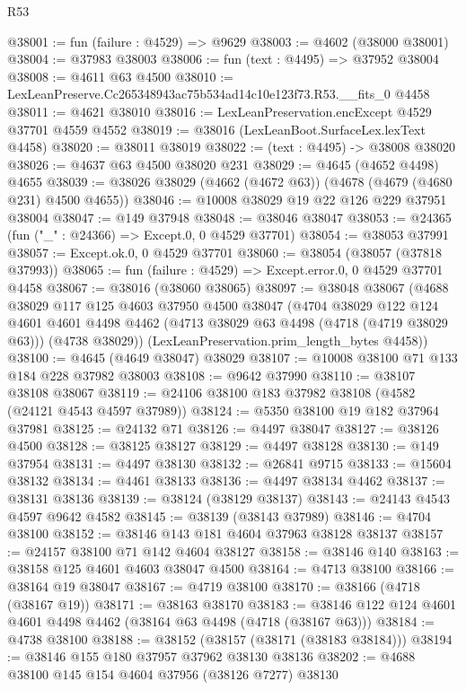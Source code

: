 \begin{lexlean}{R53}
\begin{coremodule}
@38001 := fun (failure : @4529) => @9629
@38003 := @4602 (@38000 @38001)
@38004 := @37983 @38003
@38006 := fun (text : @4495) => @37952 @38004
@38008 := @4611 @63 @4500
@38010 := LexLeanPreserve.Cc265348943ac75b534ad14c10e123f73.R53.__fits_0 @4458
@38011 := @4621 @38010
@38016 := LexLeanPreservation.encExcept @4529 @37701 @4559 @4552
@38019 := @38016 (LexLeanBoot.SurfaceLex.lexText @4458)
@38020 := @38011 @38019
@38022 := (text : @4495) -> @38008 @38020
@38026 := @4637 @63 @4500 @38020 @231
@38029 := @4645 (@4652 @4498) @4655
@38039 := @38026 @38029 (@4662 (@4672 @63)) (@4678 (@4679 (@4680 @231) @4500 @4655))
@38046 := @10008 @38029 @19 @22 @126 @229 @37951 @38004
@38047 := @149 @37948
@38048 := @38046 @38047
@38053 := @24365 (fun ("_" : @24366) => Except.{0, 0} @4529 @37701)
@38054 := @38053 @37991
@38057 := Except.ok.{0, 0} @4529 @37701
@38060 := @38054 (@38057 (@37818 @37993))
@38065 := fun (failure : @4529) => Except.error.{0, 0} @4529 @37701 @4458
@38067 := @38016 (@38060 @38065)
@38097 := @38048
    @38067
    (@4688
      @38029
      @117
      @125
      @4603
      @37950
      @4500
      @38047
      (@4704
        @38029
        @122
        @124
        @4601
        @4601
        @4498
        @4462
        (@4713 @38029 @63 @4498 (@4718 (@4719 @38029 @63)))
        (@4738 @38029))
      (LexLeanPreservation.prim_length_bytes @4458))
@38100 := @4645 (@4649 @38047) @38029
@38107 := @10008 @38100 @71 @133 @184 @228 @37982 @38003
@38108 := @9642 @37990
@38110 := @38107 @38108 @38067
@38119 := @24106 @38100 @183 @37982 @38108 (@4582 (@24121 @4543 @4597 @37989))
@38124 := @5350 @38100 @19 @182 @37964 @37981
@38125 := @24132 @71
@38126 := @4497 @38047
@38127 := @38126 @4500
@38128 := @38125 @38127
@38129 := @4497 @38128
@38130 := @149 @37954
@38131 := @4497 @38130
@38132 := @26841 @9715
@38133 := @15604 @38132
@38134 := @4461 @38133
@38136 := @4497 @38134 @4462
@38137 := @38131 @38136
@38139 := @38124 (@38129 @38137)
@38143 := @24143 @4543 @4597 @9642 @4582
@38145 := @38139 (@38143 @37989)
@38146 := @4704 @38100
@38152 := @38146 @143 @181 @4604 @37963 @38128 @38137
@38157 := @24157 @38100 @71 @142 @4604 @38127
@38158 := @38146 @140
@38163 := @38158 @125 @4601 @4603 @38047 @4500
@38164 := @4713 @38100
@38166 := @38164 @19 @38047
@38167 := @4719 @38100
@38170 := @38166 (@4718 (@38167 @19))
@38171 := @38163 @38170
@38183 := @38146 @122 @124 @4601 @4601 @4498 @4462 (@38164 @63 @4498 (@4718 (@38167 @63)))
@38184 := @4738 @38100
@38188 := @38152 (@38157 (@38171 (@38183 @38184)))
@38194 := @38146 @155 @180 @37957 @37962 @38130 @38136
@38202 := @4688 @38100 @145 @154 @4604 @37956 (@38126 @7277) @38130

\end{coremodule}
\end{lexlean}
